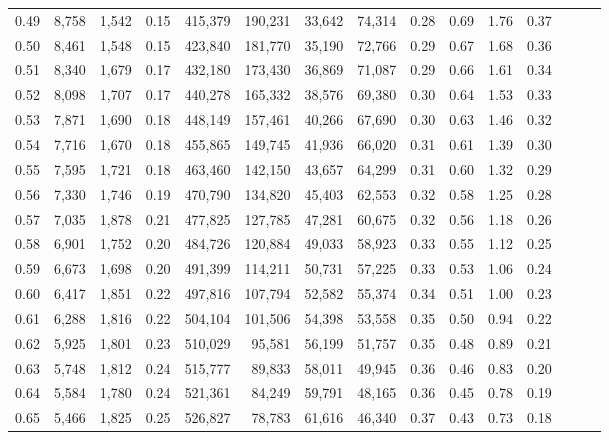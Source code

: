\begin{tabular}{rrrrrrrrrrrrrrr}
0.49 &   8,758 &  1,542 &  0.15 &  415,379 &  190,231 &   33,642 &   74,314 &  0.28 &  0.69 &  1.76 &      0.37 \\
0.50 &   8,461 &  1,548 &  0.15 &  423,840 &  181,770 &   35,190 &   72,766 &  0.29 &  0.67 &  1.68 &      0.36 \\
0.51 &   8,340 &  1,679 &  0.17 &  432,180 &  173,430 &   36,869 &   71,087 &  0.29 &  0.66 &  1.61 &      0.34 \\
0.52 &   8,098 &  1,707 &  0.17 &  440,278 &  165,332 &   38,576 &   69,380 &  0.30 &  0.64 &  1.53 &      0.33 \\
0.53 &   7,871 &  1,690 &  0.18 &  448,149 &  157,461 &   40,266 &   67,690 &  0.30 &  0.63 &  1.46 &      0.32 \\
0.54 &   7,716 &  1,670 &  0.18 &  455,865 &  149,745 &   41,936 &   66,020 &  0.31 &  0.61 &  1.39 &      0.30 \\
0.55 &   7,595 &  1,721 &  0.18 &  463,460 &  142,150 &   43,657 &   64,299 &  0.31 &  0.60 &  1.32 &      0.29 \\
0.56 &   7,330 &  1,746 &  0.19 &  470,790 &  134,820 &   45,403 &   62,553 &  0.32 &  0.58 &  1.25 &      0.28 \\
0.57 &   7,035 &  1,878 &  0.21 &  477,825 &  127,785 &   47,281 &   60,675 &  0.32 &  0.56 &  1.18 &      0.26 \\
0.58 &   6,901 &  1,752 &  0.20 &  484,726 &  120,884 &   49,033 &   58,923 &  0.33 &  0.55 &  1.12 &      0.25 \\
0.59 &   6,673 &  1,698 &  0.20 &  491,399 &  114,211 &   50,731 &   57,225 &  0.33 &  0.53 &  1.06 &      0.24 \\
0.60 &   6,417 &  1,851 &  0.22 &  497,816 &  107,794 &   52,582 &   55,374 &  0.34 &  0.51 &  1.00 &      0.23 \\
0.61 &   6,288 &  1,816 &  0.22 &  504,104 &  101,506 &   54,398 &   53,558 &  0.35 &  0.50 &  0.94 &      0.22 \\
0.62 &   5,925 &  1,801 &  0.23 &  510,029 &   95,581 &   56,199 &   51,757 &  0.35 &  0.48 &  0.89 &      0.21 \\
0.63 &   5,748 &  1,812 &  0.24 &  515,777 &   89,833 &   58,011 &   49,945 &  0.36 &  0.46 &  0.83 &      0.20 \\
0.64 &   5,584 &  1,780 &  0.24 &  521,361 &   84,249 &   59,791 &   48,165 &  0.36 &  0.45 &  0.78 &      0.19 \\
0.65 &   5,466 &  1,825 &  0.25 &  526,827 &   78,783 &   61,616 &   46,340 &  0.37 &  0.43 &  0.73 &      0.18 \\

\end{tabular}
